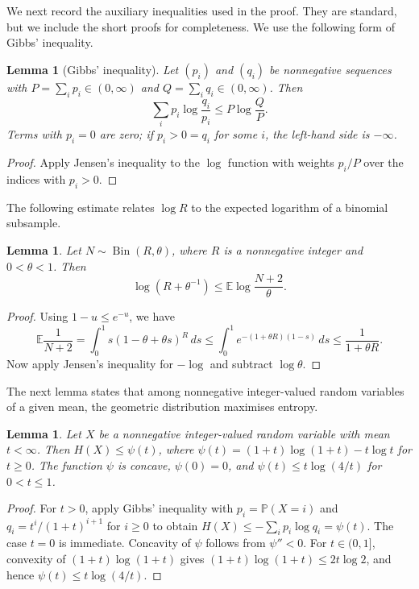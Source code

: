 \documentclass[10pt,a4paper]{amsart}
\numberwithin{equation}{section}
\newtheorem{lemma}[theorem]{Lemma}
\theoremstyle{definition}
\theoremstyle{remark}
\DeclareMathOperator{\Bin}{Bin}
\renewcommand{\Pr}{\mathbb P}
\begin{document}
We next record the auxiliary inequalities used in the proof. They are standard, but we include the short proofs for completeness. We use the following form of Gibbs' inequality.

\begin{lemma}[Gibbs' inequality]\label{lem:gibbs}
Let $(p_i)$ and $(q_i)$ be nonnegative sequences with
$P=\sum_i p_i\in(0,\infty)$ and
$Q=\sum_i q_i\in(0,\infty)$. Then
\[
    \sum_i p_i\log\frac{q_i}{p_i}
    \le P\log\frac{Q}{P}.
\]
Terms with $p_i=0$ are zero; if $p_i>0=q_i$ for some $i$,
the left-hand side is $-\infty$.
\end{lemma}

\begin{proof}
Apply Jensen's inequality to the $\log$ function with weights $p_i/P$
over the indices with $p_i>0$.
\end{proof}

The following estimate relates $\log R$ to the expected logarithm of a binomial subsample.
\begin{lemma}\label{cla:binomial}
Let $N\sim\Bin(R,\theta)$, where $R$ is a nonnegative integer
and $0<\theta<1$. Then
\[
    \log\left(R+\theta^{-1}\right)
    \le\mathbb E\log\frac{N+2}{\theta}.
\]
\end{lemma}

\begin{proof}
Using $1-u\le e^{-u}$, we have
\[
    \mathbb E\frac1{N+2}
    =\int_0^1 s(1-\theta+\theta s)^R\,ds
    \le\int_0^1 e^{-(1+\theta R)(1-s)}\,ds
    \le\frac1{1+\theta R}.
\]
Now apply Jensen's inequality for $-\log$
and subtract $\log\theta$.
\end{proof}

The next lemma states that among nonnegative integer-valued random variables of a given mean, the geometric distribution maximises entropy.

\begin{lemma}\label{lem:maxentropy}
Let $X$ be a nonnegative integer-valued random variable
with mean $t<\infty$.
Then $H(X)\le\psi(t)$, where
$\psi(t)=(1+t)\log(1+t)-t\log t$ for $t\ge0$.
The function $\psi$ is concave, $\psi(0)=0$, and
$\psi(t)\le t\log(4/t)$ for $0<t\le1$.
\end{lemma}

\begin{proof}
For $t>0$, apply Gibbs' inequality with $p_i=\Pr(X=i)$
and $q_i=t^i/(1+t)^{i+1}$ for $i\ge0$ to obtain
$H(X)\le-\sum_i p_i\log q_i=\psi(t)$.
The case $t=0$ is immediate.
Concavity of $\psi$ follows from $\psi''<0$.
For $t \in (0,1]$, convexity of $(1+t)\log (1+t)$ gives
$(1+t)\log(1+t)\le2t\log2$, and hence
$\psi(t)\le t\log(4/t)$.
\end{proof}
\end{document}
